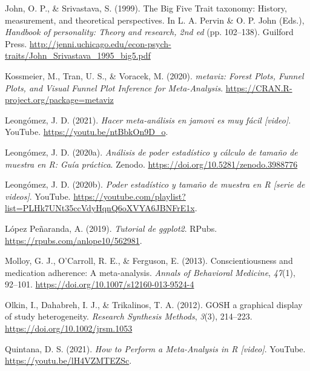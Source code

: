 \documentclass[
  bookmarksnumbered]{article}
\newlength{\cslhangindent}
\newlength{\cslentryspacingunit} %
\newenvironment{CSLReferences}[2] %
 {%
  \setlength{\parindent}{0pt}
  \ifodd #1
  \let\oldpar\par
  \def\par{\hangindent=\cslhangindent\oldpar}
  \fi
  \setlength{\parskip}{#2\cslentryspacingunit}
 }%
 {}
\begin{document}
\begin{CSLReferences}{1}{0}
\leavevmode{}%
John, O. P., \& Srivastava, S. (1999). The {Big Five Trait} taxonomy: {History}, measurement, and theoretical perspectives. In L. A. Pervin \& O. P. John (Eds.), \emph{Handbook of personality: {Theory} and research, 2nd ed} (pp. 102--138). {Guilford Press}. \url{http://jenni.uchicago.edu/econ-psych-traits/John_Srivastava_1995_big5.pdf}

\leavevmode{}%
Kossmeier, M., Tran, U. S., \& Voracek, M. (2020). \emph{{metaviz: Forest Plots, Funnel Plots, and Visual Funnel Plot Inference for Meta-Analysis}}. \url{https://CRAN.R-project.org/package=metaviz}

\leavevmode{}%
Leongómez, J. D. (2021). \emph{Hacer meta-análisis en jamovi es muy fácil \emph{{[}video{]}}}. YouTube. \url{https://youtu.be/ntBbkOn9D_o}.

\leavevmode{}%
Leongómez, J. D. (2020a). \emph{Análisis de poder estadístico y cálculo de tamaño de muestra en {R}: {Guía} práctica}. {Zenodo}. \url{https://doi.org/10.5281/zenodo.3988776}

\leavevmode{}%
Leongómez, J. D. (2020b). \emph{Poder estadístico y tamaño de muestra en {R} \emph{{[}serie de videos{]}}}. YouTube. \url{https://youtube.com/playlist?list=PLHk7UNt35ccVdyHqnQ6oXVYA6JBNFrE1x}.

\leavevmode{}%
López Peñaranda, A. (2019). \emph{Tutorial de ggplot2}. RPubs. \url{https://rpubs.com/anlope10/562981}.

\leavevmode{}%
Molloy, G. J., O'Carroll, R. E., \& Ferguson, E. (2013). Conscientiousness and medication adherence: A meta-analysis. \emph{Annals of Behavioral Medicine}, \emph{47}(1), 92--101. \url{https://doi.org/10.1007/s12160-013-9524-4}

\leavevmode{}%
Olkin, I., Dahabreh, I. J., \& Trikalinos, T. A. (2012). {GOSH} \textendash{} a graphical display of study heterogeneity. \emph{Research Synthesis Methods}, \emph{3}(3), 214--223. \url{https://doi.org/10.1002/jrsm.1053}

\leavevmode{}%
Quintana, D. S. (2021). \emph{{How to Perform a Meta-Analysis in R} \emph{{[}video{]}}}. YouTube. \url{https://youtu.be/lH4VZMTEZSc}.


\end{CSLReferences}
\end{document}
